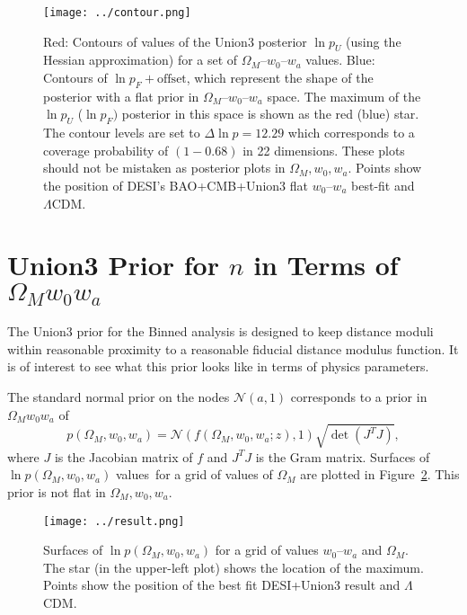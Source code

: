 \documentclass[11pt,a4paper]{article}
\begin{document}
\begin{figure}[htbp] %
   \centering
   \texttt{[image: ../contour.png]} 
   \caption{Red: Contours of values of the Union3 posterior $\ln{p}_U$ (using the Hessian approximation) for a
set of $\Omega_M$--$w_0$--$w_a$ values.
   Blue: Contours of  $\ln{p_F}+\text{offset}$, which represent the shape of the posterior with a flat prior in  $\Omega_M$--$w_0$--$w_a$ space.   
   The maximum of the $\ln{p}_U$  ($\ln{p}_F)$ posterior in this space is shown as the red (blue) star.
   The contour levels are set to $\Delta \ln{p}=12.29$ which corresponds
to a coverage probability of $(1-0.68)$ in 22 dimensions. 
   These plots should not be mistaken as posterior plots in  $\Omega_M, w_0, w_a$. 
   Points show the position of DESI's  BAO+CMB+Union3 flat $w_0$--$w_a$ best-fit 
    and  $\Lambda$CDM.}
   \label{fig:posterior}
\end{figure}

\section{Union3 Prior for $n$ in Terms of $\Omega_Mw_0w_a$}
The Union3 prior for the Binned analysis is designed to keep distance moduli within reasonable proximity to a reasonable
fiducial distance modulus function.  It is of interest to see what this prior looks like in terms of physics parameters.

The standard normal prior on the nodes $\mathcal{N}(a,1)$ corresponds to a prior in  $\Omega_Mw_0w_a$ of
\begin{equation}
p(\Omega_M, w_0,w_a) = \mathcal{N}(f(\Omega_M, w_0, w_a; z),1)  \sqrt{\det{\left(J^T J\right)}},
\end{equation}
where $J$ is the Jacobian matrix of $f$ and $J^TJ$ is the Gram matrix.
Surfaces of $\ln{p}(\Omega_M, w_0,w_a)$ values\ for a grid of values of $\Omega_M$
are plotted in Figure~\ref{fig:priors}.  This prior is not flat in  $\Omega_M, w_0, w_a$.

\begin{figure}[htbp] %
   \centering
   \texttt{[image: ../result.png]} 
   \caption{Surfaces of $\ln{p}(\Omega_M, w_0,w_a)$  for a grid of values
 $w_0$--$w_a$ and $\Omega_M$.    The star (in the upper-left plot) shows the location of the maximum.
   Points show the position of the best fit  DESI+Union3
   result and  $\Lambda$CDM.}
   \label{fig:priors}
\end{figure}
\end{document}
